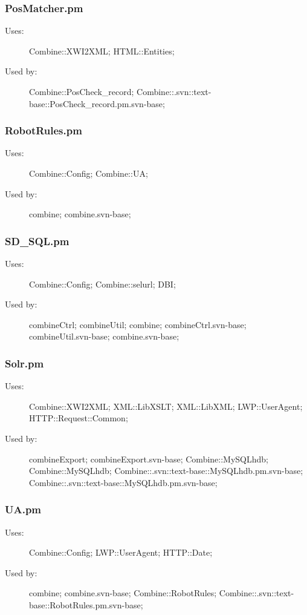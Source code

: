 \subsubsection{PosMatcher.pm}
\begin{description}
\item[Uses:] Combine::XWI2XML; HTML::Entities; 

\item[Used by:] Combine::PosCheck\_record; Combine::.svn::text-base::PosCheck\_record.pm.svn-base; 

\end{description}
\subsubsection{RobotRules.pm}
\begin{description}
\item[Uses:] Combine::Config; Combine::UA; 

\item[Used by:] combine; combine.svn-base; 

\end{description}
\subsubsection{SD\_SQL.pm}
\begin{description}
\item[Uses:] Combine::Config; Combine::selurl; DBI; 

\item[Used by:] combineCtrl; combineUtil; combine; combineCtrl.svn-base; combineUtil.svn-base; combine.svn-base; 

\end{description}
\subsubsection{Solr.pm}
\begin{description}
\item[Uses:] Combine::XWI2XML; XML::LibXSLT; XML::LibXML; LWP::UserAgent; HTTP::Request::Common; 

\item[Used by:] combineExport; combineExport.svn-base; Combine::MySQLhdb; Combine::MySQLhdb; Combine::.svn::text-base::MySQLhdb.pm.svn-base; Combine::.svn::text-base::MySQLhdb.pm.svn-base; 

\end{description}
\subsubsection{UA.pm}
\begin{description}
\item[Uses:] Combine::Config; LWP::UserAgent; HTTP::Date; 

\item[Used by:] combine; combine.svn-base; Combine::RobotRules; Combine::.svn::text-base::RobotRules.pm.svn-base; 

\end{description}
